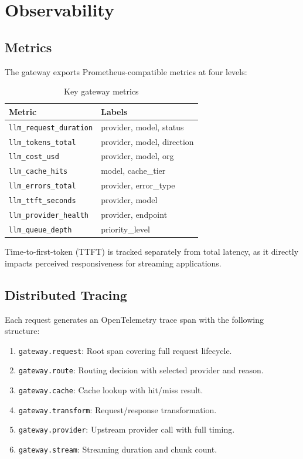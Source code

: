 \section{Observability}

\label{sec:observability}

\subsection{Metrics}

The gateway exports Prometheus-compatible metrics at four levels:

\begin{table}[t]
\centering
\caption{Key gateway metrics}
\label{tab:metrics}
\begin{tabular}{@{}ll@{}}
\toprule
\textbf{Metric} & \textbf{Labels} \\
\midrule
\texttt{llm\_request\_duration} & provider, model, status \\
\texttt{llm\_tokens\_total} & provider, model, direction \\
\texttt{llm\_cost\_usd} & provider, model, org \\
\texttt{llm\_cache\_hits} & model, cache\_tier \\
\texttt{llm\_errors\_total} & provider, error\_type \\
\texttt{llm\_ttft\_seconds} & provider, model \\
\texttt{llm\_provider\_health} & provider, endpoint \\
\texttt{llm\_queue\_depth} & priority\_level \\
\bottomrule
\end{tabular}
\end{table}

Time-to-first-token (TTFT) is tracked separately from total latency, as it directly impacts perceived responsiveness for streaming applications.

\subsection{Distributed Tracing}

Each request generates an OpenTelemetry trace span with the following structure:

\begin{enumerate}[leftmargin=*]
    \item \texttt{gateway.request}: Root span covering full request lifecycle.
    \item \texttt{gateway.route}: Routing decision with selected provider and reason.
    \item \texttt{gateway.cache}: Cache lookup with hit/miss result.
    \item \texttt{gateway.transform}: Request/response transformation.
    \item \texttt{gateway.provider}: Upstream provider call with full timing.
    \item \texttt{gateway.stream}: Streaming duration and chunk count.
\end{enumerate}

